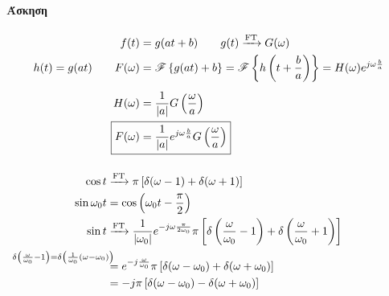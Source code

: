     \paragraph{Άσκηση}
     \begin{align*}
     f(t) &= g(at+b) \qquad g(t)\xrightarrow{\text{FT}}G(\omega ) \\
     h(t)=g(at) \qquad
     F(\omega ) &= \mathscr F\left\lbrace g(at)+b \right\rbrace
     = \mathscr F \left\lbrace h\left(t+\frac{b}{a}\right) \right\rbrace
     = H(\omega )e^{j\omega \frac{b}{a}} \\[5pt]
     H(\omega ) &= \frac{1}{|a|}G\left(\frac{\omega}{a}\right) \\
     \Aboxed{F(\omega ) &=
     \frac{1}{|a|}e^{j\omega\frac{b}{a}}G\left(\frac{\omega}{a}\right)}
     \end{align*}

     \paragraph{}
     \begin{align*}
     \cos t &\xrightarrow{\text{FT}} \pi\left[
     \delta(\omega -1)+\delta(\omega +1)
     \right] \\
     \sin \omega_0 t &= \cos\left(\omega_0t-\frac{\pi}{2}\right)
     \\
     \sin t &\xrightarrow{\text{FT}}
     \frac{1}{|\omega_0|}e^{-j\omega\frac{\pi}{2\omega_0}}\pi
     \left[ \delta\left(\frac{\omega}{\omega_0}-1\right)
     +\delta\left(\frac{\omega}{\omega_0} + 1\right)
      \right]
      \\ &\overset{\mathllap{\delta\left(\frac{\omega}{\omega_0}-1\right)
        = \delta\left(\frac{1}{\omega_0}(\omega-\omega_0)\right)}
        }{=}
        e^{-j\frac{\omega}{\omega_0}}\pi\left[
        \delta(\omega-\omega_0)+\delta(\omega +\omega_0)
        \right] \\ &= -j\pi\left[
        \delta(\omega -\omega_0)-\delta(\omega+\omega_0)
        \right]
     \end{align*}

     \paragraph{}
     \hspace{0pt}


